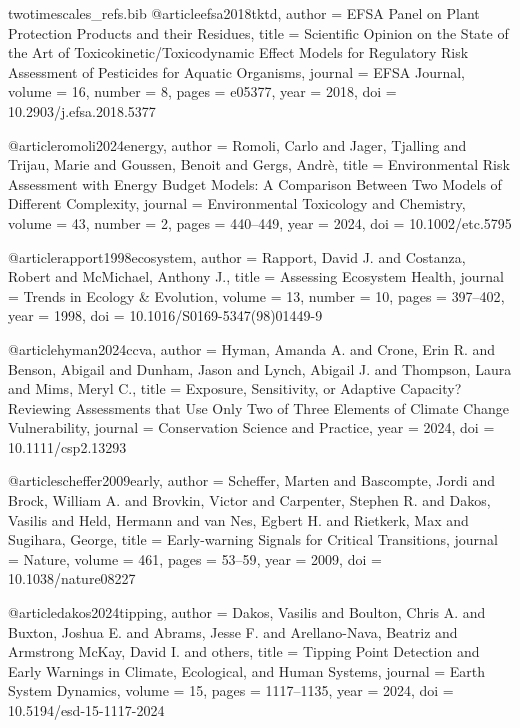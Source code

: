 \begin{filecontents*}{twotimescales_refs.bib}
	@article{efsa2018tktd,
		author  = {{EFSA Panel on Plant Protection Products and their Residues}},
		title   = {Scientific Opinion on the State of the Art of Toxicokinetic/Toxicodynamic Effect Models for Regulatory Risk Assessment of Pesticides for Aquatic Organisms},
		journal = {EFSA Journal},
		volume  = {16},
		number  = {8},
		pages   = {e05377},
		year    = {2018},
		doi     = {10.2903/j.efsa.2018.5377}
	}
	
	@article{romoli2024energy,
		author  = {Romoli, Carlo and Jager, Tjalling and Trijau, Marie and Goussen, Benoit and Gergs, Andr{\`e}},
		title   = {Environmental Risk Assessment with Energy Budget Models: A Comparison Between Two Models of Different Complexity},
		journal = {Environmental Toxicology and Chemistry},
		volume  = {43},
		number  = {2},
		pages   = {440--449},
		year    = {2024},
		doi     = {10.1002/etc.5795}
	}
	
	@article{rapport1998ecosystem,
		author  = {Rapport, David J. and Costanza, Robert and McMichael, Anthony J.},
		title   = {Assessing Ecosystem Health},
		journal = {Trends in Ecology \& Evolution},
		volume  = {13},
		number  = {10},
		pages   = {397--402},
		year    = {1998},
		doi     = {10.1016/S0169-5347(98)01449-9}
	}
	
	@article{hyman2024ccva,
		author  = {Hyman, Amanda A. and Crone, Erin R. and Benson, Abigail and Dunham, Jason and Lynch, Abigail J. and Thompson, Laura and Mims, Meryl C.},
		title   = {Exposure, Sensitivity, or Adaptive Capacity? Reviewing Assessments that Use Only Two of Three Elements of Climate Change Vulnerability},
		journal = {Conservation Science and Practice},
		year    = {2024},
		doi     = {10.1111/csp2.13293}
	}
	
	@article{scheffer2009early,
		author  = {Scheffer, Marten and Bascompte, Jordi and Brock, William A. and Brovkin, Victor and Carpenter, Stephen R. and Dakos, Vasilis and Held, Hermann and van Nes, Egbert H. and Rietkerk, Max and Sugihara, George},
		title   = {Early-warning Signals for Critical Transitions},
		journal = {Nature},
		volume  = {461},
		pages   = {53--59},
		year    = {2009},
		doi     = {10.1038/nature08227}
	}
	
	@article{dakos2024tipping,
		author  = {Dakos, Vasilis and Boulton, Chris A. and Buxton, Joshua E. and Abrams, Jesse F. and Arellano-Nava, Beatriz and Armstrong McKay, David I. and others},
		title   = {Tipping Point Detection and Early Warnings in Climate, Ecological, and Human Systems},
		journal = {Earth System Dynamics},
		volume  = {15},
		pages   = {1117--1135},
		year    = {2024},
		doi     = {10.5194/esd-15-1117-2024}
	}
	

\end{filecontents*}
